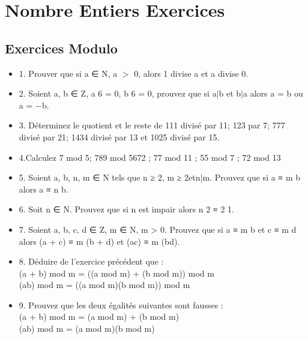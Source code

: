 \newpage

\chapter{Nombre Entiers Exercices}

\vspace{3mm} %
\section{Exercices Modulo}
\vspace{3mm} %

\begin{itemize}

\item {1. Prouver que si a ∈ N, a $>$ 0, alors 1 divise a et a divise 0. }

\item {2. Soient a, b ∈ Z, a 6 = 0, b 6 = 0, prouvez que si a$|$b et b$|$a alors a = b ou a = −b.}

\item {3. Déterminez le quotient et le reste de 111 divisé par 11; 123 par 7; 777
divisé par 21; 1434 divisé par 13 et 1025 divisé par 15.}

\item {4.Calculez 7 mod 5; 789 mod 5672 ; 77 mod 11 ; 55 mod 7 ; 72 mod 13}

\item{5. Soient a, b, n, m ∈ N tels que n ≥ 2, m ≥ 2etn|m. Prouvez que si a ≡ m b alors a ≡ n b.}

\item {6. Soit n ∈ N. Prouvez que si n est impair alors n 2 ≡ 2 1.}

\item {7. Soient a, b, c, d ∈ Z, m ∈ N, m > 0. Prouvez que si a ≡ m b et c ≡ m d alors (a + c) ≡ m (b + d) et (ac) ≡ m (bd).}

\item {8. Déduire de l’exercice précédent que :\\
      (a + b) mod m = ((a mod m) + (b mod m)) mod m \\
      (ab) mod m = ((a mod m)(b mod m)) mod m }

\item {9. Prouvez que les deux égalités suivantes sont fausses : \\
      (a + b) mod m = (a mod m) + (b mod m) \\
      (ab) mod m = (a mod m)(b mod m)}
\end{itemize}


